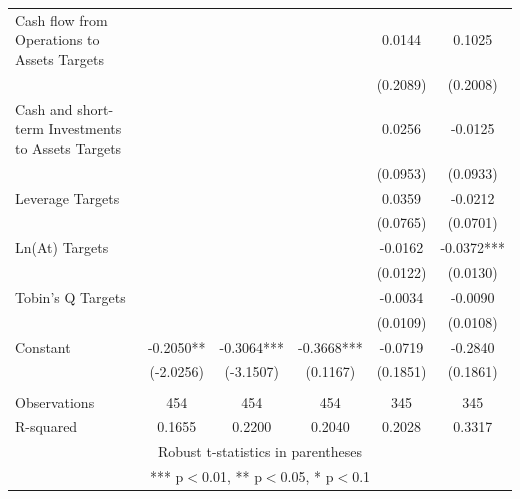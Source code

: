 \documentclass[12pt]{article}
\begin{document}
\begin{table}[ht]
\begin{adjustbox}{height=10cm, max width=\textwidth}
\begin{tabular}{lccccc}
			Cash flow from Operations to Assets Targets &  &  &  & 0.0144 & 0.1025 \\
			 &  &  &  & (0.2089) & (0.2008) \\
			Cash and short-term Investments to Assets Targets &  &  &  & 0.0256 & -0.0125 \\
			 &  &  &  & (0.0953) & (0.0933) \\
			Leverage Targets &  &  &  & 0.0359 & -0.0212 \\
			 &  &  &  & (0.0765) & (0.0701) \\
			Ln(At) Targets &  &  &  & -0.0162 & -0.0372*** \\
			 &  &  &  & (0.0122) & (0.0130) \\
			Tobin's Q Targets &  &  &  & -0.0034 & -0.0090 \\
			 &  &  &  & (0.0109) & (0.0108) \\
			Constant & -0.2050** & -0.3064*** & -0.3668*** & -0.0719 & -0.2840 \\
			 & (-2.0256) & (-3.1507) & (0.1167) & (0.1851) & (0.1861) \\
			 &  &  &  &  &  \\
			Observations & 454 & 454 & 454 & 345 & 345 \\
			 R-squared & 0.1655 & 0.2200 & 0.2040 & 0.2028 & 0.3317 \\ \hline
			\multicolumn{6}{c}{ Robust t-statistics in parentheses} \\
			\multicolumn{6}{c}{ *** p$<$0.01, ** p$<$0.05, * p$<$0.1} \\
			\end{tabular}
			
		   
	\end{adjustbox}
	\end{table}
\end{document}
